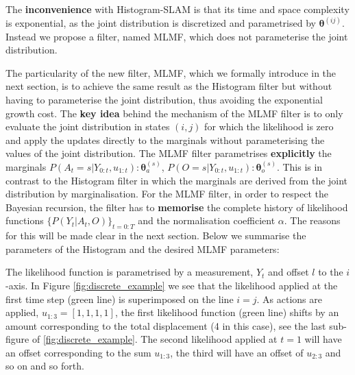 The \textbf{inconvenience} with Histogram-SLAM is that its time and space complexity is exponential, as the joint distribution is discretized and 
parametrised by $\boldsymbol{\theta}^{(ij)}$. Instead we propose a filter, named MLMF, which does not parameterise the joint distribution.

The particularity of the new filter, MLMF, which we formally introduce in the next section, is to achieve the same result as 
the Histogram filter but without having to parameterise the joint distribution, thus avoiding the exponential growth cost. 
The \textbf{key idea} behind the mechanism of the MLMF filter is to only evaluate the joint distribution in states $(i,j)$ 
for which the likelihood is zero and apply the updates directly to the marginals without parameterising the values of the joint distribution.
The MLMF filter parametrises \textbf{explicitly} the marginals $P(A_t=s|Y_{0:t},u_{1:t}): \boldsymbol{\theta}_a^{(s)}$, $P(O=s|Y_{0:t},u_{1:t}): \boldsymbol{\theta}_o^{(s)}$. This is in contrast to the Histogram filter in which the marginals are  
derived from the joint distribution by marginalisation. For the MLMF filter, in order to respect the Bayesian recursion, the filter has 
to \textbf{memorise} the complete history of likelihood functions $\{P(Y_t|A_t,O)\}_{t=0:T}$ and the normalisation coefficient $\alpha$. 
The reasons for this will be made clear in the next section. Below we summarise the parameters of the Histogram and the 
desired MLMF parameters:

\begin{center}
\begin{minipage}{0.55\textwidth}
\end{minipage}
\end{center}

The likelihood function is parametrised by a measurement, $Y_t$ and offset $l$ to the $i$-axis. In Figure \ref{fig:discrete_example} we see that
the likelihood applied at the first time step (green line) is superimposed on the line $i=j$. As actions are applied, $u_{1:3}=[1,1,1,1]$, 
the first likelihood function (green line) shifts by an amount corresponding to the total displacement (4 in this case), see the last sub-figure of
\ref{fig:discrete_example}. The second likelihood applied at $t=1$ will have an offset corresponding to the sum $u_{1:3}$, the third will have 
an offset of $u_{2:3}$ and so on and so forth.

